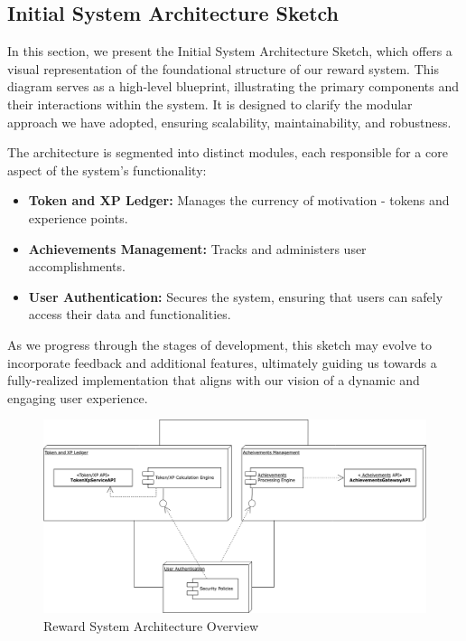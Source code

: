 \subsection{Initial System Architecture Sketch}
In this section, we present the Initial System Architecture Sketch, which offers a visual representation of the foundational structure of our reward system. This diagram serves as a high-level blueprint, illustrating the primary components and their interactions within the system. It is designed to clarify the modular approach we have adopted, ensuring scalability, maintainability, and robustness.

The architecture is segmented into distinct modules, each responsible for a core aspect of the system's functionality:
\begin{itemize}
    \item \textbf{Token and XP Ledger:} Manages the currency of motivation - tokens and experience points.
    \item \textbf{Achievements Management:} Tracks and administers user accomplishments.
    \item \textbf{User Authentication:} Secures the system, ensuring that users can safely access their data and functionalities.
\end{itemize}

As we progress through the stages of development, this sketch may evolve to incorporate feedback and additional features, ultimately guiding us towards a fully-realized implementation that aligns with our vision of a dynamic and engaging user experience.

 \begin{figure}[H]
    \centering
    \includegraphics[width=1\textwidth]{src/assets/chapters/reward-deployement-diagram.drawio.png}
    \caption{ Reward System Architecture Overview}
    \label{fig:reward_system_architecture_overview}
\end{figure}

